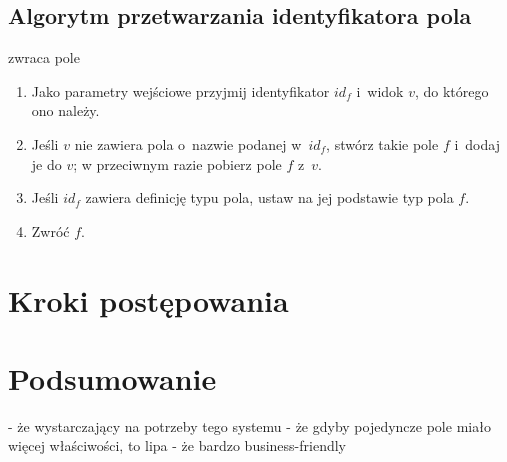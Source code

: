 \subsection{Algorytm przetwarzania identyfikatora pola}

zwraca pole

\begin{enumerate}
 \item Jako parametry wejściowe przyjmij identyfikator $id_f$ i~widok $v$, do którego ono należy.
 \item Jeśli $v$ nie zawiera pola o~nazwie podanej w~$id_f$, stwórz takie pole $f$ i~dodaj je do $v$; w przeciwnym razie pobierz pole $f$ z~$v$.
 \item Jeśli $id_f$ zawiera definicję typu pola, ustaw na jej podstawie typ pola $f$.
 \item Zwróć $f$.
\end{enumerate}



\section{Kroki postępowania}



\section{Podsumowanie}

- że wystarczający na potrzeby tego systemu
- że gdyby pojedyncze pole miało więcej właściwości, to lipa
- że bardzo business-friendly
